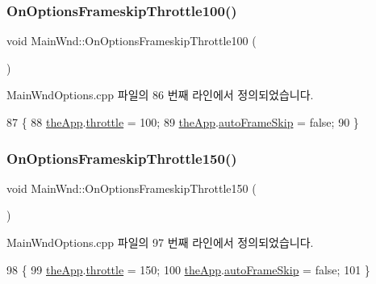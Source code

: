 \subsubsection{\texorpdfstring{On\+Options\+Frameskip\+Throttle100()}{OnOptionsFrameskipThrottle100()}}
{\footnotesize\ttfamily void Main\+Wnd\+::\+On\+Options\+Frameskip\+Throttle100 (\begin{DoxyParamCaption}{ }\end{DoxyParamCaption})\hspace{0.3cm}{\ttfamily [protected]}}



Main\+Wnd\+Options.\+cpp 파일의 86 번째 라인에서 정의되었습니다.


\begin{DoxyCode}
87 \{
88   \mbox{\hyperlink{_v_b_a_8cpp_a8095a9d06b37a7efe3723f3218ad8fb3}{theApp}}.\mbox{\hyperlink{class_v_b_a_af21b98509a2589b38e4787f065b40a2b}{throttle}} = 100;  
89   \mbox{\hyperlink{_v_b_a_8cpp_a8095a9d06b37a7efe3723f3218ad8fb3}{theApp}}.\mbox{\hyperlink{class_v_b_a_a9ecbee7d82db73b24aee3afb66128388}{autoFrameSkip}} = \textcolor{keyword}{false};
90 \}
\end{DoxyCode}
\mbox{\label{class_main_wnd_a39292c20b9a0cddfbd60d5230bbe0b3e}} 
\subsubsection{\texorpdfstring{On\+Options\+Frameskip\+Throttle150()}{OnOptionsFrameskipThrottle150()}}
{\footnotesize\ttfamily void Main\+Wnd\+::\+On\+Options\+Frameskip\+Throttle150 (\begin{DoxyParamCaption}{ }\end{DoxyParamCaption})\hspace{0.3cm}{\ttfamily [protected]}}



Main\+Wnd\+Options.\+cpp 파일의 97 번째 라인에서 정의되었습니다.


\begin{DoxyCode}
98 \{
99   \mbox{\hyperlink{_v_b_a_8cpp_a8095a9d06b37a7efe3723f3218ad8fb3}{theApp}}.\mbox{\hyperlink{class_v_b_a_af21b98509a2589b38e4787f065b40a2b}{throttle}} = 150;  
100   \mbox{\hyperlink{_v_b_a_8cpp_a8095a9d06b37a7efe3723f3218ad8fb3}{theApp}}.\mbox{\hyperlink{class_v_b_a_a9ecbee7d82db73b24aee3afb66128388}{autoFrameSkip}} = \textcolor{keyword}{false};
101 \}
\end{DoxyCode}
\mbox{\label{class_main_wnd_a989cf9b90b96b67c9c016cd3652d2e6e}} 
